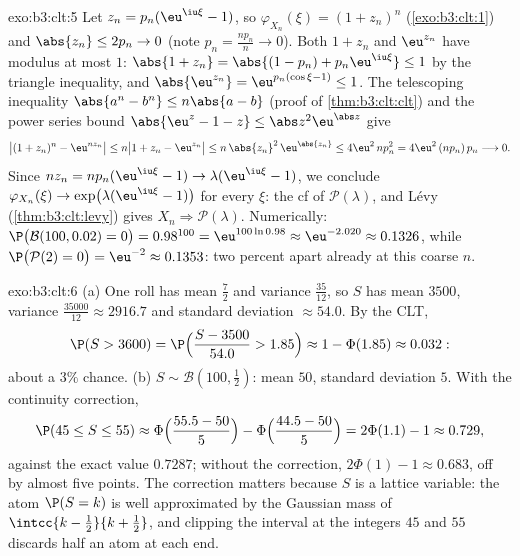 \begin{solution}{exo:b3:clt:5}
Let $z_n = p_n(\eu^{\iu\xi} - 1)$, so $\varphi_{X_n}(\xi) =
(1 + z_n)^n$ (\cref{exo:b3:clt:1}) and $\abs{z_n} \leq 2p_n
\to 0$ (note $p_n = \frac{np_n}n \to 0$). Both $1 + z_n$ and
$\eu^{z_n}$ have modulus at most $1$: $\abs{1 + z_n} =
\abs{(1 - p_n) + p_n\eu^{\iu\xi}} \leq 1$ by the triangle
inequality, and $\abs{\eu^{z_n}} = \eu^{p_n(\cos\xi - 1)}
\leq 1$. The telescoping inequality $\abs{a^n - b^n} \leq
n\abs{a - b}$ (proof of \cref{thm:b3:clt:clt}) and the power
series bound $\abs{\eu^z - 1 - z} \leq
\abs z^2\eu^{\abs z}$ give
\[
\bigl|(1 + z_n)^n - \eu^{nz_n}\bigr| \leq n\bigl|1 + z_n -
\eu^{z_n}\bigr| \leq n\,\abs{z_n}^2\,\eu^{\abs{z_n}} \leq
4\eu^2\,np_n^2 = 4\eu^2\,(np_n)\,p_n \longrightarrow 0 .
\]
Since $nz_n = np_n(\eu^{\iu\xi} - 1) \to
\lambda(\eu^{\iu\xi} - 1)$, we conclude $\varphi_{X_n}(\xi)
\to \exp\bigl(\lambda(\eu^{\iu\xi} - 1)\bigr)$ for every
$\xi$: the cf of $\mathcal P(\lambda)$, and L\'evy
(\cref{thm:b3:clt:levy}) gives $X_n \Rightarrow \mathcal
P(\lambda)$. Numerically: $\P\bigl(\mathcal B(100, 0.02) =
0\bigr) = 0.98^{100} = \eu^{100\ln 0.98} \approx
\eu^{-2.020} \approx 0.1326$, while $\P\bigl(\mathcal P(2) =
0\bigr) = \eu^{-2} \approx 0.1353$: two percent apart
already at this coarse $n$.
\end{solution}

\begin{solution}{exo:b3:clt:6}
(a) One roll has mean $\frac72$ and variance
$\frac{35}{12}$, so $S$ has mean $3500$, variance
$\frac{35000}{12} \approx 2916.7$ and standard deviation
$\approx 54.0$. By the CLT,
\[
\P(S > 3600) = \P\Bigl(\frac{S - 3500}{54.0} > 1.85\Bigr)
\approx 1 - \Phi(1.85) \approx 0.032 :
\]
about a $3\%$ chance.
(b) $S \sim \mathcal B(100, \frac12)$: mean $50$, standard
deviation $5$. With the continuity correction,
\[
\P(45 \leq S \leq 55) \approx
\Phi\Bigl(\frac{55.5 - 50}{5}\Bigr) -
\Phi\Bigl(\frac{44.5 - 50}{5}\Bigr) = 2\Phi(1.1) - 1
\approx 0.729,
\]
against the exact value $0.7287$; without the correction,
$2\Phi(1) - 1 \approx 0.683$, off by almost five points. The
correction matters because $S$ is a lattice variable: the
atom $\P(S = k)$ is well approximated by the Gaussian mass
of $\intcc{k - \frac12}{k + \frac12}$, and clipping the
interval at the integers $45$ and $55$ discards half an atom
at each end.
\end{solution}

